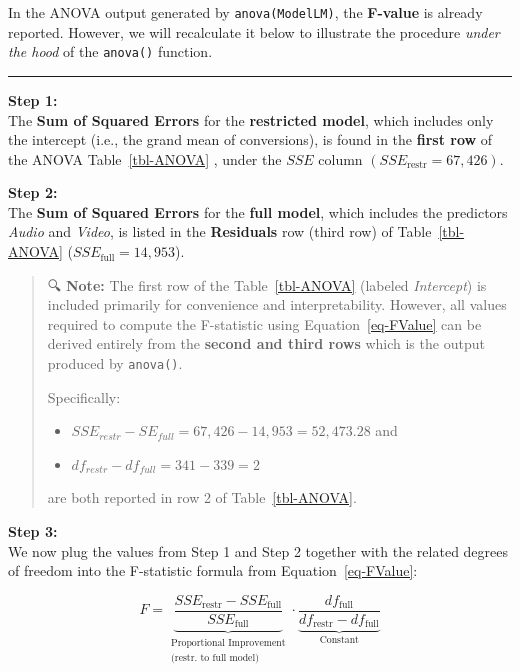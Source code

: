 \documentclass[
  letterpaper,
  DIV=11,
  numbers=noendperiod]{scrartcl}
\providecommand{\tightlist}{%
  \setlength{\itemsep}{0pt}\setlength{\parskip}{0pt}}\usepackage{longtable,booktabs,array}
\begin{document}
In the ANOVA output generated by \texttt{anova(ModelLM)}, the
\textbf{F-value} is already reported. However, we will recalculate it
below to illustrate the procedure \emph{under the hood} of the
\texttt{anova()} function.

\begin{center}\rule{0.5\linewidth}{0.5pt}\end{center}

\textbf{Step 1:}\\
The \textbf{Sum of Squared Errors} for the \textbf{restricted model},
which includes only the intercept (i.e., the grand mean of conversions),
is found in the \textbf{first row} of the ANOVA Table~\ref{tbl-ANOVA} ,
under the \(SSE\) column \((SSE_{\text{restr}} = 67,\!426)\).

\textbf{Step 2:}\\
The \textbf{Sum of Squared Errors} for the \textbf{full model}, which
includes the predictors \emph{Audio} and \emph{Video}, is listed in the
\textbf{Residuals} row (third row) of Table~\ref{tbl-ANOVA}
(\(SSE_{\text{full}} = 14,\!953\)).

\begin{quote}
🔍 \textbf{Note:} The first row of the Table~\ref{tbl-ANOVA} (labeled
\emph{Intercept}) is included primarily for convenience and
interpretability. However, all values required to compute the
F-statistic using Equation~\ref{eq-FValue} can be derived entirely from
the \textbf{second and third rows} which is the output produced by
\texttt{anova()}.

Specifically:

\begin{itemize}
\tightlist
\item
  \(SSE_{restr}-SE_{full}=67,\!426-14,\!953=52,\!473.28\) and
\item
  \(df_{restr}-df_{full}= 341-339=2\)
\end{itemize}

are both reported in row 2 of Table~\ref{tbl-ANOVA}.
\end{quote}

\textbf{Step 3:}\\
We now plug the values from Step 1 and Step 2 together with the related
degrees of freedom into the F-statistic formula from
Equation~\ref{eq-FValue}:

\[
F =
\underbrace{\frac{SSE_{\text{restr}} - SSE_{\text{full}}}{SSE_{\text{full}}}}_{
\begin{array}{c}
\text{Proportional Improvement} \\
\text{(restr. to full model)}
\end{array}
}
\cdot
\underbrace{\frac{df_{\text{full}}}{df_{\text{restr}} - df_{\text{full}}}}_{\text{Constant}}
\]
\end{document}
